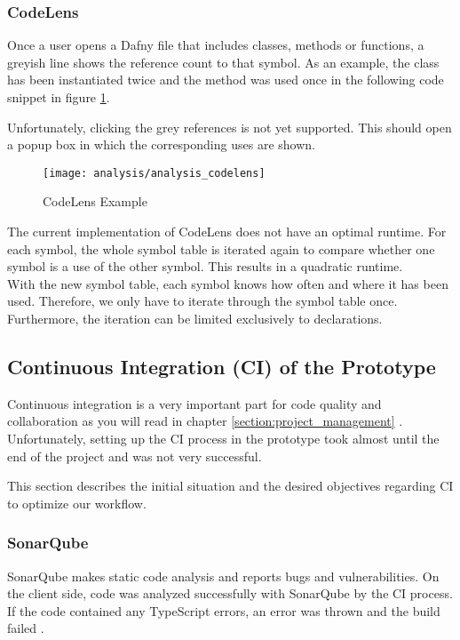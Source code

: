 \subsubsection{CodeLens}
Once a user opens a Dafny file that includes classes, methods or functions, a greyish line shows the reference count to that symbol.
As an example, the class  has been instantiated twice and the method  was used once in the following code snippet in figure \ref{fig:analysis_codelens}.

Unfortunately, clicking the grey references is not yet supported.
This should open a popup box in which the corresponding uses are shown.

\begin{figure}[H]
    \centering
    \texttt{[image: analysis/analysis\_codelens]}
    \caption{CodeLens Example}
    \label{fig:analysis_codelens}
\end{figure}

The current implementation of CodeLens does not have an optimal runtime.
For each symbol, the whole symbol table is iterated again to compare whether one symbol is a use of the other symbol.
This results in a quadratic runtime. \\

With the new symbol table, each symbol knows how often and where it has been used.
Therefore, we only have to iterate through the symbol table once.
Furthermore, the iteration can be limited exclusively to declarations.




\subsection{Continuous Integration (CI) of the Prototype}
\label{section:analysis:CI}

Continuous integration is a very important part for code quality and collaboration
as you will read in chapter \ref{section:project_management} .
Unfortunately, setting up the CI process in the prototype took almost until the end of the project
and was not very successful.

This section describes the initial situation and the desired objectives regarding CI to optimize our workflow.

\subsubsection{SonarQube}
SonarQube makes static code analysis and reports bugs and vulnerabilities.
On the client side, code was analyzed successfully with SonarQube by the CI process.
If the code contained any TypeScript errors, an error was thrown and the build failed \cite{sa}.\\

